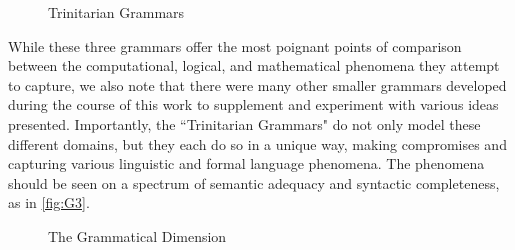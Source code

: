 \begin{figure}[H]
\centering
{}
\caption{Trinitarian Grammars} \label{fig:G2}
\end{figure}

While these three grammars offer the most poignant points of comparison between
the computational, logical, and mathematical phenomena they attempt to capture,
we also note that there were many other smaller grammars developed during the
course of this work to supplement and experiment with various ideas presented.
Importantly, the ``Trinitarian Grammars" do not only model these different
domains, but they each do so in a unique way, making compromises and capturing
various linguistic and formal language phenomena. The phenomena should be seen
on a spectrum of semantic adequacy and syntactic completeness, as
in \autoref{fig:G3}.


\begin{figure}[H]
\centering
{}
\caption{The Grammatical Dimension} \label{fig:G3}
\end{figure}


